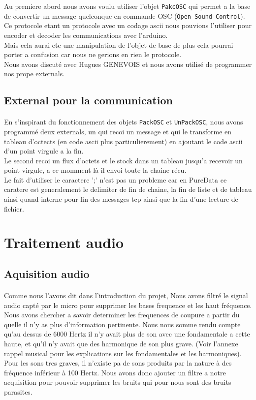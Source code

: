 \documentclass[a4paper, titlepage, oneside, 12pt]{article}%
\begin{document}
Au premiere abord nous avons voulu utiliser l'objet \texttt{PakcOSC} qui permet a la base de convertir un message quelconque en commande OSC (\texttt{Open Sound Control}). Ce protocole etant un protocole avec un codage ascii nous pouvions l'utiliser pour encoder et decoder les communications avec l'arduino. \\
Mais cela aurai ete une manipulation de l'objet de base de plus cela pourrai porter a confusion car nous ne gerions en rien le protocole.\\
Nous avons discuté avec Hugues GENEVOIS et nous avons utilisé de programmer nos prope externals.

\subsection{External pour la communication}
\paragraph{}
En s'inspirant du fonctionnement des objets \texttt{PackOSC} et \texttt{UnPackOSC}, nous avons programmé deux externals, un qui recoi un message et qui le transforme en tableau d'octects (en code ascii plus particulierement) en ajoutant le code ascii d'un point virgule a la fin.\\
Le second recoi un flux d'octets et le stock dans un tableau jusqu'a recevoir un point virgule, a ce momment là il envoi toute la chaine récu.\\
Le fait d'utiliser le caractere ';' n'est pas un probleme car en PureData ce caratere est generalement le delimiter de fin de chaine, la fin de liste et de tableau ainsi quand interne pour fin des messages tcp ainsi que la fin d'une lecture de fichier.

\section{Traitement audio}
\subsection{Aquisition audio}
\paragraph{}
Comme nous l'avons dit dans l'introduction du projet, Nous avons filtré le signal audio capté par le micro pour supprimer les bases frequence et les haut fréquence.\\
Nous avons chercher a savoir determiner les frequences de coupure a partir du quelle il n'y as plus d'information pertinente. Nous nous somme rendu compte qu'au dessus de 6000 Hertz il n'y avait plus de son avec une fondamentale a cette haute, et qu'il n'y avait que des harmonique de son plus grave. (Voir l'annexe rappel musical pour les explications sur les fondamentales et les harmoniques).\\
Pour les sons tres graves, il n'existe pa de sons produits par la nature à des fréquence inférieur à 100 Hertz. Nous avons donc ajouter un filtre a notre acquisition pour pouvoir supprimer les bruits qui pour nous sont des bruits parasites.
\end{document}
